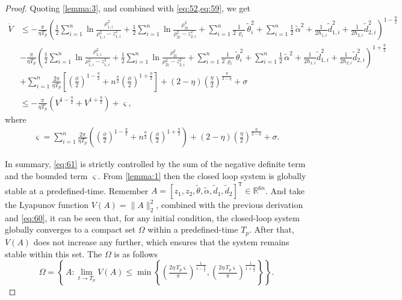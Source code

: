 \documentclass[pdflatex,sn-mathphys-num]{sn-jnl}%
\theoremstyle{thmstyleone}%
\theoremstyle{thmstyletwo}%
\theoremstyle{thmstylethree}%
\begin{document}
\begin{proof}
Quoting \cref{lemma:3}, and combined with \cref{eq:52,eq:59}, we get
\begin{equation}\label{eq:60}
	\begin{aligned}
		\dot{V}
		 & \le-\frac{\pi}{\eta T_{p}}\left(\frac{1}{2}\sum_{i=1}^{n} \ln\frac{\rho_{1,i}^2}{\rho_{1,i}^2-z_{1,i}^2}
		+ \frac{1}{2}\sum_{i=1}^{n} \ln\frac{\rho_{2i}^2}{\rho_{2i}^2-z_{2,i}^2}
		+ \sum_{i=1}^{n}\frac{1}{2\,\varrho_i}\,\tilde \theta_{i}^2+\sum_{i=1}^{n}\frac{1}{2}\,{\tilde{\alpha}}^2+\frac{1}{2\hbar_{1,i}}{\tilde d}^2_{1,i}+\frac{1}{2\hbar_{2,i}}{\tilde d}^2_{2,i}\right)^{1-\frac{\eta}{2}} \\
		 & -\frac{\pi }{\eta T_{p}}\left(\frac{1}{2}\sum_{i=1}^{n} \ln\frac{\rho_{1,i}^2}{\rho_{1,i}^2-z_{1,i}^2}
		+ \frac{1}{2}\sum_{i=1}^{n} \ln\frac{\rho_{2i}^2}{\rho_{2i}^2-z_{2,i}^2}
		+ \sum_{i=1}^{n}\frac{1}{2\,\varrho_i}\,\tilde \theta_{i}^2+\sum_{i=1}^{n}\frac{1}{2}\,{\tilde{\alpha}}^2+\frac{1}{2\hbar_{1,i}}{\tilde d}^2_{1,i}+\frac{1}{2\hbar_{2,i}}{\tilde d}^2_{2,i}\right)^{1+\frac{\eta}{2}} \\
		 & +\sum_{i=1}^{n}\frac{2\pi}{\eta T_{p}} \left[  \left(\frac{\phi}{2}\right)^{1-\frac{\eta}{2}} + n^{\frac\eta2}\left(\frac{\phi}{2}\right)^{1+\frac{\eta}{2}}  \right]+\left( 2-\eta\right) \left(\frac{\eta}{2}\right)^{\frac{\eta}{2-\eta}}+\sigma      \\
		 & \le-\frac{\pi}{\eta T_{p}}\left( V^{1-\frac{\eta}{2}}+V^{1+\frac{\eta}{2}}\right)+\varsigma    ,                                                                    
	\end{aligned}
\end{equation}
where
\begin{equation}\label{eq:61}
	\begin{aligned}
\varsigma =\sum_{i=1}^{n}\frac{2\pi}{\eta T_{p}} \left(  (\frac{\phi}{2})^{1-\frac{\eta}{2}} + n^{\frac\eta2}(\frac{\phi}{2})^{1+\frac{\eta}{2}}  \right)+\left( 2-\eta\right) \left(\frac{\eta}{2}\right)^{\frac{\eta}{2-\eta}}+\sigma.
		\end{aligned}
\end{equation}

In summary, \cref{eq:61} is strictly controlled by the sum of the negative definite term and the bounded term $\varsigma$. From \cref{lemma:1} then the closed loop system is globally stable at a predefined-time. Remember 
$A=\left[z_1, z_2,\tilde \theta,\tilde \alpha, {\tilde d}_{1}, {\tilde d}_{2}\right]^{\mathsf T} \in \mathbb{R}^{6n}$. And take the Lyapunov function $V(A)=\|A\|_2^2$, combined with the previous derivation and \cref{eq:60}, it can be seen that, for any initial condition, the closed-loop system globally converges to a compact set $\Omega$ within a predefined-time $T_p$. After that, $V(A)$ does not increase any further, which ensures that the system remains stable within this set. The $\Omega$ is as follows
\begin{equation}\label{eq:62}
	\Omega
	=\left\{\,A : \lim_{t\to T_p}V(A) \le
	\min\left\{
	\left(\tfrac{2\eta\,T_p \varsigma }{\pi}\right)^{\!{\frac{1}{1-\frac{\eta}{2}}}}\!,
	\left(\tfrac{2\eta\,T_p \varsigma }{\pi}\right)^{\!{\frac{1}{1+\frac{\eta}{2}}}}
	\right\}\right\}.
\end{equation}


\end{proof}
\end{document}
